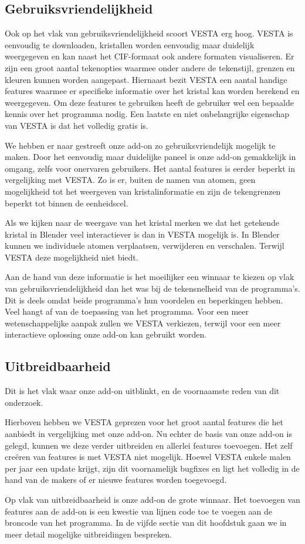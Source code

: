 \subsection{Gebruiksvriendelijkheid}	 
Ook op het vlak van gebruiksvriendelijkheid scoort VESTA erg hoog. VESTA is eenvoudig te downloaden, kristallen worden eenvoudig maar duidelijk weergegeven en kan naast het CIF-formaat ook andere formaten visualiseren. Er zijn een groot aantal tekenopties waarmee onder andere de tekenstijl, grenzen en kleuren kunnen worden aangepast. Hiernaast bezit VESTA een aantal handige features waarmee er specifieke informatie over het kristal kan worden berekend en weergegeven. Om deze features te gebruiken heeft de gebruiker wel een bepaalde kennis over het programma nodig. Een laatste en niet  onbelangrijke eigenschap van VESTA is dat het volledig gratis is.
\par
We hebben er naar gestreeft onze add-on zo gebruiksvriendelijk mogelijk te maken. Door het eenvoudig maar duidelijke paneel is onze add-on gemakkelijk in omgang, zelfs voor onervaren gebruikers. Het aantal features is eerder beperkt in vergelijking met VESTA. Zo is er, buiten de namen van atomen, geen mogelijkheid tot het weergeven van kristalinformatie en zijn de tekengrenzen beperkt tot binnen de eenheidscel. 
\par
Als we kijken naar de weergave van het kristal merken we dat het getekende kristal in Blender veel interactiever is dan in VESTA mogelijk is. In Blender kunnen we individuele atomen verplaatsen, verwijderen en verschalen. Terwijl VESTA deze mogelijkheid niet biedt.
\par
Aan de hand van deze informatie is het moeilijker een winnaar te kiezen op vlak van gebruiksvriendelijkheid dan het was bij de tekensnelheid van de programma's. Dit is deels omdat beide programma's hun voordelen en beperkingen hebben. Veel hangt af van de toepassing van het programma. Voor een meer wetenschappelijke aanpak zullen we VESTA verkiezen, terwijl voor een meer interactieve oplossing onze add-on kan gebruikt worden.

\subsection{Uitbreidbaarheid}
Dit is het vlak waar onze add-on uitblinkt, en de voornaamste reden van dit onderzoek. 
\par
Hierboven hebben we VESTA geprezen voor het groot aantal features die het aanbiedt in vergelijking met onze add-on. Nu echter de basis van onze add-on is gelegd, kunnen we deze verder uitbreiden en allerlei features toevoegen. Het zelf creëren van features is met VESTA niet mogelijk. Hoewel VESTA enkele malen per jaar een update krijgt, zijn dit voornamelijk bugfixes en ligt het volledig in de hand van de makers of er nieuwe features worden toegevoegd.   
\par
Op vlak van uitbreidbaarheid is onze add-on de grote winnaar. Het toevoegen van features aan de add-on is een kwestie van lijnen code toe te voegen aan de broncode van het programma. In de vijfde sectie van dit hoofdstuk gaan we in meer detail mogelijke uitbreidingen bespreken. 


